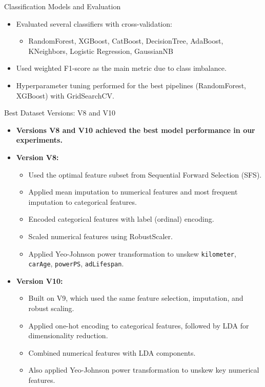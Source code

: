 \documentclass{beamer}
\begin{document}
\begin{frame}{Classification Models and Evaluation}
    \begin{itemize}
        \item Evaluated several classifiers with cross-validation:
        \begin{itemize}
            \item RandomForest, XGBoost, CatBoost, DecisionTree, AdaBoost, KNeighbors, Logistic Regression, GaussianNB
        \end{itemize}
        \item Used weighted F1-score as the main metric due to class imbalance.
        \item Hyperparameter tuning performed for the best pipelines (RandomForest, XGBoost) with GridSearchCV.
    \end{itemize}
\end{frame}

\begin{frame}{Best Dataset Versions: V8 and V10}
    \begin{itemize}
        \item \textbf{Versions V8 and V10 achieved the best model performance in our experiments.}
        \item \textbf{Version V8:}
        \begin{itemize}
            \item Used the optimal feature subset from Sequential Forward Selection (SFS).
            \item Applied mean imputation to numerical features and most frequent imputation to categorical features.
            \item Encoded categorical features with label (ordinal) encoding.
            \item Scaled numerical features using RobustScaler.
            \item Applied Yeo-Johnson power transformation to unskew \texttt{kilometer}, \texttt{carAge}, \texttt{powerPS}, \texttt{adLifespan}.
        \end{itemize}
        \item \textbf{Version V10:}
        \begin{itemize}
            \item Built on V9, which used the same feature selection, imputation, and robust scaling.
            \item Applied one-hot encoding to categorical features, followed by LDA for dimensionality reduction.
            \item Combined numerical features with LDA components.
            \item Also applied Yeo-Johnson power transformation to unskew key numerical features.
        \end{itemize}
    \end{itemize}
\end{frame}
\end{document}
